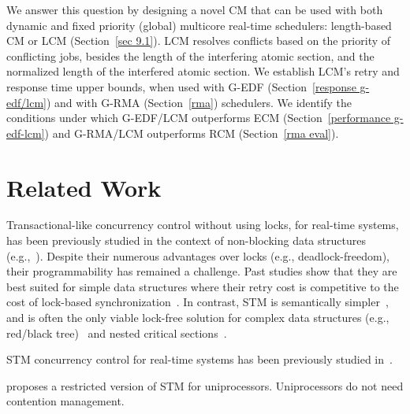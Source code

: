 \documentclass[conference]{IEEEtran}
\begin{document}
We answer this question by designing a novel CM that can be used with both dynamic and fixed priority (global) multicore real-time schedulers: length-based CM or LCM (Section~\ref{sec 9.1}). LCM resolves conflicts based on the priority of conflicting jobs, besides the length of the interfering atomic section, and the normalized length of the interfered atomic section.  We establish LCM's retry and response time upper bounds, when used with G-EDF (Section~\ref{response g-edf/lcm}) and with G-RMA (Section~\ref{rma}) schedulers. We identify the conditions under which G-EDF/LCM outperforms ECM (Section~\ref{performance g-edf-lcm}) and G-RMA/LCM outperforms RCM (Section~\ref{rma eval}). 

\section{Related Work}
\label{sec:past}

Transactional-like concurrency control without using locks, for real-time systems, has been previously studied in the context of non-blocking data structures (e.g.,~\cite{anderson95realtime}). Despite their numerous advantages over locks 
(e.g., deadlock-freedom), 
their programmability has remained a challenge. 
Past studies show that they are best suited for simple data structures where their retry cost is competitive to the cost of lock-based synchronization~\cite{bc+08}.  In contrast, STM is semantically simpler~\cite{Herlihy:2006:AMP:1146381.1146382}, and is often the only viable lock-free solution for complex data structures (e.g., red/black tree)~\cite{key-1} and nested critical sections~\cite{Saha:2006:MHP:1122971.1123001}.

STM concurrency control for real-time systems has been previously studied in~\cite{manson2006preemptible,fahmy2009bounding,sarni2009real,schoeberl2010rttm,key-1,barrosmanaging,stmconcurrencycontrol:emsoft11}.


\cite{manson2006preemptible} proposes a restricted version of STM for uniprocessors. Uniprocessors do not need contention management.
\end{document}
